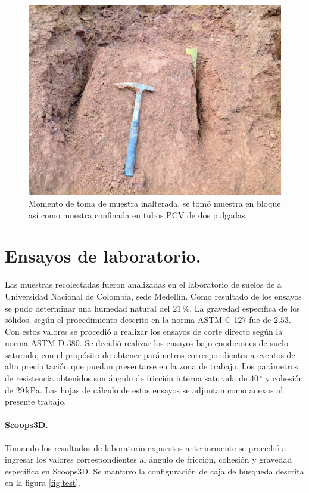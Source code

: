 \begin{figure}[H]
\centering
\includegraphics[scale=0.20]{img/estacion11.jpg}
\caption{Momento de toma de muestra inalterada, se tom\'o muestra en bloque as\'i como muestra confinada en tubos PCV de dos pulgadas.}
\label{fig:toma-bloque}
\end{figure}

\section{Ensayos de laboratorio.}

Las muestras recolectadas fueron analizadas en el laboratorio de suelos de a Universidad Nacional de Colombia, sede Medellín.
Como resultado de los ensayos se pudo determinar una humedad natural del \(21\,\%\).
La gravedad específica de los s\'olidos, seg\'un el procedimiento descrito en la norma ASTM C-127 fue de \(2.53\).
Con estos valores se procedi\'o a realizar los ensayos de corte directo seg\'un la norma ASTM D-380. Se decidi\'o realizar los ensayos bajo condiciones de suelo saturado, con el propósito de obtener par\'ametros correspondientes a eventos de alta precipitaci\'on que puedan presentarse en la zona de trabajo.
Los par\'ametros de resistencia obtenidos son ángulo de fricción interna saturada de \(40\,^\circ\) y cohesi\'on de \(29\,\text{kPa}\). Las hojas de c\'alculo de estos ensayos se adjuntan como anexos al presente trabajo.

\paragraph{Scoops3D.}
Tomando los resultados de laboratorio expuestos anteriormente se procedió a ingresar los valores correspondientes al \'angulo de fricción, cohesi\'on y gravedad espec\'ifica en Scoops3D. Se mantuvo la configuración de caja de b\'usqueda descrita en la figura \ref{fig:test}.

